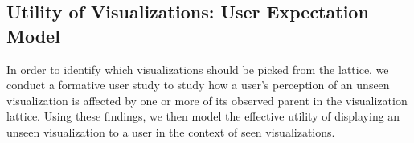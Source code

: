 \subsection{Utility of Visualizations: User Expectation Model}
In order to identify which visualizations should be picked from the lattice, we conduct a formative user study 
to study how a user's perception of an unseen visualization is affected by one or more of its observed parent in the visualization lattice. Using these findings, we then model the effective utility of displaying an unseen visualization to a user in the context of seen visualizations.%
 

